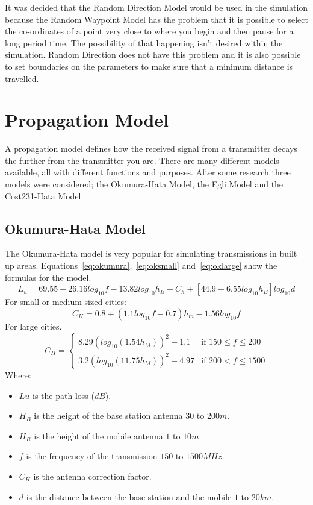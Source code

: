 It was decided that the Random Direction Model would be used in the simulation because the Random Waypoint Model has the problem that it is possible to select the co-ordinates of a point very close to where you begin and then pause for a long period time. The possibility of that happening isn’t desired within the simulation. Random Direction does not have this problem and it is also possible to set boundaries on the parameters to make sure that a minimum distance is travelled.~\cite{roy2010handbook}

\section{Propagation Model}\label{propagation}
A propagation model defines how the received signal from a transmitter decays the further from the transmitter you are. There are many different models available, all with different functions and purposes. After some research three models were considered; the Okumura-Hata Model, the Egli Model and the Cost231-Hata Model.
\subsection{Okumura-Hata Model}
The Okumura-Hata model is very popular for simulating transmissions in built up areas. Equations~\ref{eq:okumura},~\ref{eq:oksmall} and~\ref{eq:oklarge} show the formulas for the model.
\begin{equation}\label{eq:okumura}
L_{u}=69.55+26.16log_{10}f-13.82log_{10}h_{B}-C_{h}+[44.9-6.55log_{10}h_{B}]log_{10}d 
\end{equation}
For small or medium sized cities:
\begin{equation}\label{eq:oksmall}
C_{H}=0.8+(1.1log_{10}f-0.7)h_{m}-1.56log_{10}f
\end{equation}
For large cities.
\begin{equation}\label{eq:oklarge}
C_{H}=
	\begin{cases}
	8.29(log_{10}(1.54h_{M}))^{2}-1.1 & \mbox{if } 150 \leq f \leq 200 \\
	3.2(log_{10}(11.75h_{M}))^{2}-4.97 & \mbox{if } 200 < f \leq 1500
	\end{cases}
\end{equation}
Where:
\begin{itemize}
\item $Lu$ is the path loss ($dB$).
\item $H_{B}$ is the height of the base station antenna $30$ to $200 m$.
\item $H_{R}$ is the height of the mobile antenna $1$ to $10 m$.
\item $f$ is the frequency of the transmission $150$ to $1500 MHz$.
\item $C_{H}$ is the antenna correction factor.
\item $d$ is the distance between the base station and the mobile $1$ to $20 km$.
\end{itemize}
